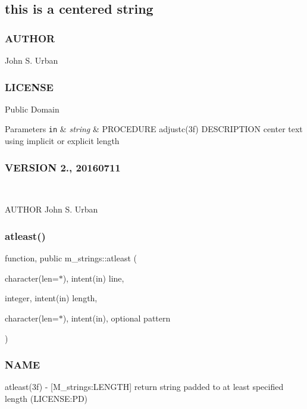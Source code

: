 \subsection*{this is a centered string }

\subsubsection*{A\+U\+T\+H\+OR}

John S. Urban \subsubsection*{L\+I\+C\+E\+N\+SE}

Public Domain


\begin{DoxyParams}[1]{Parameters}
\mbox{\tt in}  & {\em string} & P\+R\+O\+C\+E\+D\+U\+RE adjustc(3f) D\+E\+S\+C\+R\+I\+P\+T\+I\+ON center text using implicit or explicit length \subsubsection*{V\+E\+R\+S\+I\+ON 2., 20160711}\\
\hline
\end{DoxyParams}
A\+U\+T\+H\+OR John S. Urban \mbox{\label{namespacem__strings_ab20ba3a07833232eb3c67d4020a7fe64}} 
\subsubsection{\texorpdfstring{atleast()}{atleast()}}
{\footnotesize\ttfamily function, public m\+\_\+strings\+::atleast (\begin{DoxyParamCaption}\item[{character(len=$\ast$), intent(in)}]{line,  }\item[{integer, intent(in)}]{length,  }\item[{character(len=$\ast$), intent(in), optional}]{pattern }\end{DoxyParamCaption})}



\subsubsection*{N\+A\+ME}

atleast(3f) -\/ \mbox{[}M\+\_\+strings\+:L\+E\+N\+G\+TH\mbox{]} return string padded to at least specified length (L\+I\+C\+E\+N\+SE\+:PD) 

